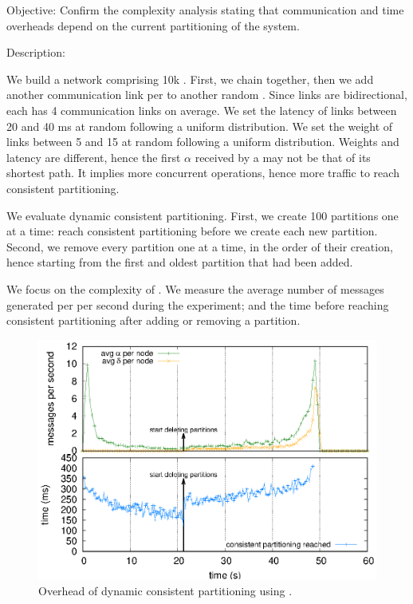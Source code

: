 \begin{asparadesc}
\item [Objective:] Confirm the complexity analysis stating that
  communication and time overheads depend on the current partitioning
  of the system.
  
\item [Description:]

We build a network comprising 10k \processes. First, we chain
\processes together, then we add another communication link per
\process to another random \process. Since links are bidirectional,
each \process has 4 communication links on average. We set the latency
of links between 20 and 40 ms at random following a uniform
distribution. We set the weight of links between 5 and 15 at random
following a uniform distribution. Weights and latency are different,
hence the first $\alpha$ received by a \process may not be that of its
shortest path. It implies more concurrent operations, hence more
traffic to reach consistent partitioning.

\noindent We evaluate dynamic consistent partitioning. First, we
create 100 partitions one at a time: \processes reach consistent
partitioning before we create each new partition. Second, we remove
every partition one at a time, in the order of their creation, hence
starting from the first and oldest partition that had been added.

\noindent We focus on the complexity of \NAME. We measure the average
number of messages generated per \process per second during the
experiment; and the time before reaching consistent partitioning after
adding or removing a partition.

\begin{figure}
  \centering\includegraphics[width=\FIGSCALE\columnwidth]{img/as_cast_complexity.eps}
  \caption{\label{fig:complexity}Overhead of dynamic consistent partitioning
    using \NAME.}
  

\end{figure}
\end{asparadesc}
